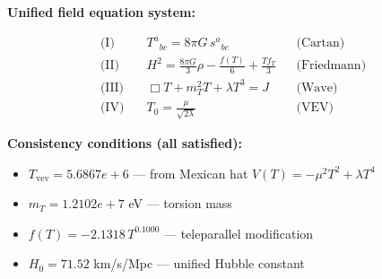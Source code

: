 
\textbf{Unified field equation system:}

\begin{align}
  \text{(I)} \quad & T^a{}_{bc} = 8\pi G \, s^a{}_{bc} && \text{(Cartan)} \\
  \text{(II)} \quad & H^2 = \frac{8\pi G}{3}\rho - \frac{f(T)}{6} + \frac{Tf_T}{3} && \text{(Friedmann)} \\
  \text{(III)} \quad & \Box T + m_T^2 T + \lambda T^3 = J && \text{(Wave)} \\
  \text{(IV)} \quad & T_0 = \frac{\mu}{\sqrt{2\lambda}} && \text{(VEV)}
\end{align}

\textbf{Consistency conditions (all satisfied):}
\begin{itemize}
  \item $T_{\text{vev}} = 5.6867e+6$ — from Mexican hat $V(T) = -\mu^2 T^2 + \lambda T^4$
  \item $m_T = 1.2102e+7$ eV — torsion mass
  \item $f(T) = -2.1318 \, T^{0.1000}$ — teleparallel modification
  \item $H_0 = 71.52$ km/s/Mpc — unified Hubble constant
\end{itemize}